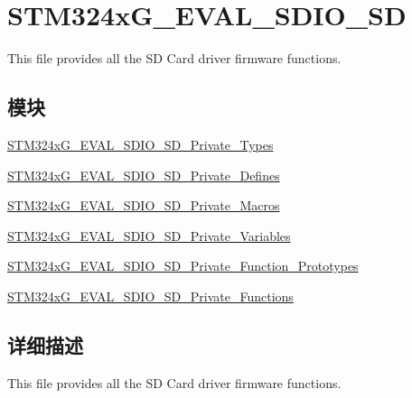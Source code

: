 \hypertarget{group___s_t_m324x_g___e_v_a_l___s_d_i_o___s_d}{}\section{S\+T\+M324x\+G\+\_\+\+E\+V\+A\+L\+\_\+\+S\+D\+I\+O\+\_\+\+SD}
\label{group___s_t_m324x_g___e_v_a_l___s_d_i_o___s_d}


This file provides all the SD Card driver firmware functions.  


\subsection*{模块}
\begin{DoxyCompactItemize}
\item 
\hyperlink{group___s_t_m324x_g___e_v_a_l___s_d_i_o___s_d___private___types}{S\+T\+M324x\+G\+\_\+\+E\+V\+A\+L\+\_\+\+S\+D\+I\+O\+\_\+\+S\+D\+\_\+\+Private\+\_\+\+Types}
\item 
\hyperlink{group___s_t_m324x_g___e_v_a_l___s_d_i_o___s_d___private___defines}{S\+T\+M324x\+G\+\_\+\+E\+V\+A\+L\+\_\+\+S\+D\+I\+O\+\_\+\+S\+D\+\_\+\+Private\+\_\+\+Defines}
\item 
\hyperlink{group___s_t_m324x_g___e_v_a_l___s_d_i_o___s_d___private___macros}{S\+T\+M324x\+G\+\_\+\+E\+V\+A\+L\+\_\+\+S\+D\+I\+O\+\_\+\+S\+D\+\_\+\+Private\+\_\+\+Macros}
\item 
\hyperlink{group___s_t_m324x_g___e_v_a_l___s_d_i_o___s_d___private___variables}{S\+T\+M324x\+G\+\_\+\+E\+V\+A\+L\+\_\+\+S\+D\+I\+O\+\_\+\+S\+D\+\_\+\+Private\+\_\+\+Variables}
\item 
\hyperlink{group___s_t_m324x_g___e_v_a_l___s_d_i_o___s_d___private___function___prototypes}{S\+T\+M324x\+G\+\_\+\+E\+V\+A\+L\+\_\+\+S\+D\+I\+O\+\_\+\+S\+D\+\_\+\+Private\+\_\+\+Function\+\_\+\+Prototypes}
\item 
\hyperlink{group___s_t_m324x_g___e_v_a_l___s_d_i_o___s_d___private___functions}{S\+T\+M324x\+G\+\_\+\+E\+V\+A\+L\+\_\+\+S\+D\+I\+O\+\_\+\+S\+D\+\_\+\+Private\+\_\+\+Functions}
\end{DoxyCompactItemize}


\subsection{详细描述}
This file provides all the SD Card driver firmware functions. 

